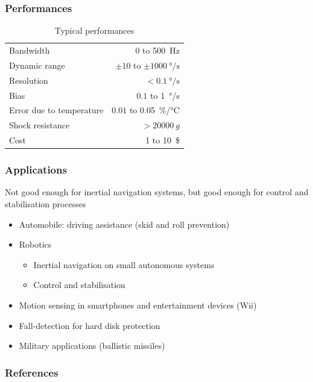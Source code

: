 \documentclass[10pt]{beamer}
\begin{document}
\begin{frame}
\frametitle{Performances}
    \begin{table}
    \begin{tabular}{lr}
        \toprule
        Bandwidth                   & 0 to \SI{500}{\hertz} \\
        Dynamic range               & $\pm 10$ to $\pm \SI{1000}{\degree/\second}$ \\
        Resolution                  & $< \SI{0.1}{\degree/\second}$ \\
        Bias                        & $0.1$ to \SI{1}{\degree/\second} \\
        Error due to temperature    & $0.01$ to \SI{0.05}{\%/\celsius} \\
        Shock resistance            & $> \SI{20000}{g}$ \\
        Cost                        & 1 to \SI{10}{\$} \\
        \bottomrule
    \end{tabular}
    \caption{Typical performances}
    \end{table}
\end{frame}

\begin{frame}
\frametitle{Applications}
    Not good enough for inertial navigation systems, but good enough for control and stabilisation processes
    \begin{itemize}
        \item Automobile: driving assistance (skid and roll prevention)
        \item Robotics
        \begin{itemize}
            \item Inertial navigation on small autonomous systems
            \item Control and stabilisation
        \end{itemize}
        \item Motion sensing in smartphones and entertainment devices (Wii)
        \item Fall-detection for hard disk protection
        \item Military applications (ballistic missiles)
    \end{itemize}
\end{frame}


\begin{frame}[allowframebreaks]
\frametitle{References}
    
    
\end{frame}

\end{document}
